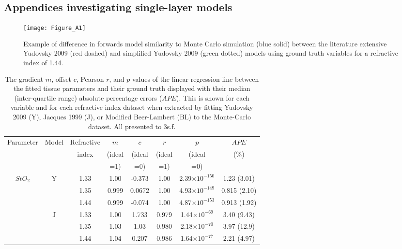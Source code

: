 % 
\clearpage
\begin{subappendices}
    \section{Appendices investigating single-layer models}
\begin{figure}[htb!]
    \centering
    \texttt{[image: Figure\_A1]}
    \caption{Example of difference in forwards model similarity to Monte Carlo simulation (blue solid) between the literature extensive Yudovsky 2009 (red dashed) and simplified Yudovsky 2009 (green dotted) models using ground truth variables for a refractive index of 1.44.}
 \label{fig:badYudovsky}
\end{figure}

\begin{table}[htb!]
    \centering
    \caption{The gradient $m$, offset $c$, Pearson $r$, and $p$ values of the linear regression line between the fitted tissue parameters and their ground truth displayed with their median (inter-quartile range) absolute percentage errors ($APE$). This is shown for each variable and for each refractive index dataset when extracted by fitting Yudovsky 2009 (Y), Jacques 1999 (J), or Modified Beer-Lambert (BL) to the Monte-Carlo dataset. All presented to 3s.f.}
    \begin{tabular}{|ccc|ccccc|}
        \hline
        Parameter & Model & Refractive & $m$ & $c$ & $r$ & $p$ & $APE$ \\
        & & index & (ideal & (ideal & (ideal & (ideal & (\%)\\
        & & & =1) & =0) & =1) & =0) & \\
        \hline
        \multirow{9}{*}{$StO_2$} & \multirow{3}{*}{Y} & 1.33 & 1.00 & -0.373 & 1.00 & 2.39$\times 10^{-150}$ & 1.23 (3.01) \\
        & & 1.35 & 0.999 & 0.0672 & 1.00 & 4.93$\times 10^{-149}$ & 0.815 (2.10) \\
        & & 1.44 & 0.999 & -0.074 & 1.00 & 4.87$\times 10^{-153}$ & 0.913 (1.92) \\
        \cline{2-8}
        & \multirow{3}{*}{J} & 1.33 & 1.00 & 1.733 & 0.979 & 1.44$\times 10^{-69}$ & 3.40 (9.43) \\
        & & 1.35 & 1.03 & 1.03 & 0.980 & 2.18$\times 10^{-70}$ & 3.97 (12.9) \\
        & & 1.44 &  1.04 & 0.207 & 0.986 & 1.64$\times 10^{-77}$ & 2.21 (4.97) \\

\end{tabular}
\end{table}
\end{subappendices}
